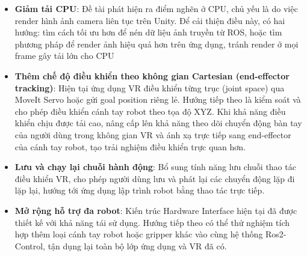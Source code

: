 \begin{itemize}
    \item \textbf{Giảm tải CPU}: Đề tài phát hiện ra điểm nghẽn ở CPU, chủ yếu là do việc render hình ảnh camera liên tục trên Unity. Để cải thiện điều này, có hai hướng: tìm cách tối ưu hơn để nén dữ liệu ảnh truyền từ ROS, hoặc tìm phương pháp để render ảnh hiệu quả hơn trên ứng dụng, tránh render ở mọi frame gây tải lớn cho CPU

    \item \textbf{Thêm chế độ điều khiển theo không gian Cartesian (end-effector tracking)}: Hiện tại ứng dụng VR điều khiển từng trục (joint space) qua MoveIt Servo hoặc gửi goal position riêng lẻ. Hướng tiếp theo là kiểm soát và cho phép điều khiển cánh tay robot theo tọa độ XYZ. Khi khả năng điều khiển chịu được tải cao, nâng cấp lên khả năng theo dõi chuyển động bàn tay của người dùng trong không gian VR và ánh xạ trực tiếp sang end-effector của cánh tay robot, tạo trải nghiệm điều khiển trực quan hơn.

    \item \textbf{Lưu và chạy lại chuỗi hành động}: Bổ sung tính năng lưu chuỗi thao tác điều khiển VR, cho phép người dùng lưu và phát lại các chuyển động lặp đi lặp lại, hướng tới ứng dụng lập trình robot bằng thao tác trực tiếp.

    \item \textbf{Mở rộng hỗ trợ đa robot}: Kiến trúc Hardware Interface hiện tại đã được thiết kế với khả năng tái sử dụng. Hướng tiếp theo có thể thử nghiệm tích hợp thêm loại cánh tay robot hoặc gripper khác vào cùng hệ thống Ros2-Control, tận dụng lại toàn bộ lớp ứng dụng và VR đã có.
\end{itemize}